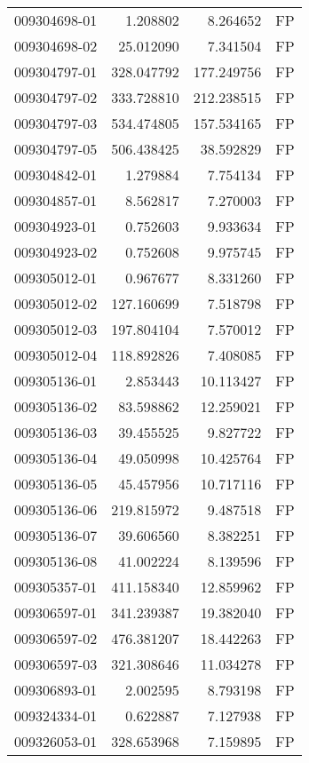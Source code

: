 \begin{tabular}{lrrl}
009304698-01 &    1.208802 &     8.264652 &   FP \\
009304698-02 &   25.012090 &     7.341504 &   FP \\
009304797-01 &  328.047792 &   177.249756 &   FP \\
009304797-02 &  333.728810 &   212.238515 &   FP \\
009304797-03 &  534.474805 &   157.534165 &   FP \\
009304797-05 &  506.438425 &    38.592829 &   FP \\
009304842-01 &    1.279884 &     7.754134 &   FP \\
009304857-01 &    8.562817 &     7.270003 &   FP \\
009304923-01 &    0.752603 &     9.933634 &   FP \\
009304923-02 &    0.752608 &     9.975745 &   FP \\
009305012-01 &    0.967677 &     8.331260 &   FP \\
009305012-02 &  127.160699 &     7.518798 &   FP \\
009305012-03 &  197.804104 &     7.570012 &   FP \\
009305012-04 &  118.892826 &     7.408085 &   FP \\
009305136-01 &    2.853443 &    10.113427 &   FP \\
009305136-02 &   83.598862 &    12.259021 &   FP \\
009305136-03 &   39.455525 &     9.827722 &   FP \\
009305136-04 &   49.050998 &    10.425764 &   FP \\
009305136-05 &   45.457956 &    10.717116 &   FP \\
009305136-06 &  219.815972 &     9.487518 &   FP \\
009305136-07 &   39.606560 &     8.382251 &   FP \\
009305136-08 &   41.002224 &     8.139596 &   FP \\
009305357-01 &  411.158340 &    12.859962 &   FP \\
009306597-01 &  341.239387 &    19.382040 &   FP \\
009306597-02 &  476.381207 &    18.442263 &   FP \\
009306597-03 &  321.308646 &    11.034278 &   FP \\
009306893-01 &    2.002595 &     8.793198 &   FP \\
009324334-01 &    0.622887 &     7.127938 &   FP \\
009326053-01 &  328.653968 &     7.159895 &   FP \\

\end{tabular}
